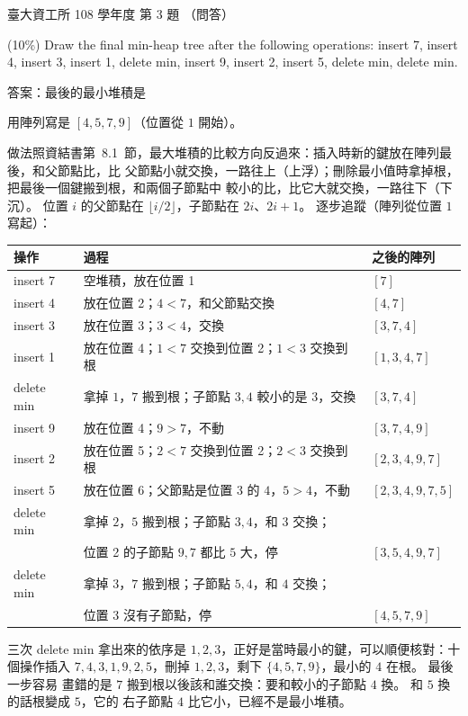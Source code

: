 \begin{pastexam}[label={px:ntu-108-dsaa-03}]{臺大資工所 108 學年度 第 3 題}
（問答）

(10\%) Draw the final min-heap tree after the following operations: insert 7, insert 4, insert 3,
insert 1, delete min, insert 9, insert 2, insert 5, delete min, delete min.
\end{pastexam}

\begin{pastsoln}
答案：最後的最小堆積是
\begin{center}
\end{center}
用陣列寫是 $[4, 5, 7, 9]$（位置從 $1$ 開始）。

做法照資結書第~8.1~節，最大堆積的比較方向反過來：插入時新的鍵放在陣列最後，和父節點比，比
父節點小就交換，一路往上（上浮）；刪除最小值時拿掉根，把最後一個鍵搬到根，和兩個子節點中
較小的比，比它大就交換，一路往下（下沉）。 位置 $i$ 的父節點在 $\lfloor i/2 \rfloor$，子節點在
$2i$、$2i + 1$。 逐步追蹤（陣列從位置 $1$ 寫起）：
\begin{center}
\small
\begin{tabular}{lll}
\toprule
操作 & 過程 & 之後的陣列 \\
\midrule
insert 7 & 空堆積，放在位置 1 & $[7]$ \\
insert 4 & 放在位置 2；$4 < 7$，和父節點交換 & $[4, 7]$ \\
insert 3 & 放在位置 3；$3 < 4$，交換 & $[3, 7, 4]$ \\
insert 1 & 放在位置 4；$1 < 7$ 交換到位置 2；$1 < 3$ 交換到根 & $[1, 3, 4, 7]$ \\
delete min & 拿掉 $1$，$7$ 搬到根；子節點 $3, 4$ 較小的是 $3$，交換 & $[3, 7, 4]$ \\
insert 9 & 放在位置 4；$9 > 7$，不動 & $[3, 7, 4, 9]$ \\
insert 2 & 放在位置 5；$2 < 7$ 交換到位置 2；$2 < 3$ 交換到根 & $[2, 3, 4, 9, 7]$ \\
insert 5 & 放在位置 6；父節點是位置 3 的 $4$，$5 > 4$，不動 & $[2, 3, 4, 9, 7, 5]$ \\
delete min & 拿掉 $2$，$5$ 搬到根；子節點 $3, 4$，和 $3$ 交換； & \\
 & \quad 位置 2 的子節點 $9, 7$ 都比 $5$ 大，停 & $[3, 5, 4, 9, 7]$ \\
delete min & 拿掉 $3$，$7$ 搬到根；子節點 $5, 4$，和 $4$ 交換； & \\
 & \quad 位置 3 沒有子節點，停 & $[4, 5, 7, 9]$ \\
\bottomrule
\end{tabular}
\end{center}

三次 delete min 拿出來的依序是 $1, 2, 3$，正好是當時最小的鍵，可以順便核對：十個操作插入
$7, 4, 3, 1, 9, 2, 5$，刪掉 $1, 2, 3$，剩下 $\{4, 5, 7, 9\}$，最小的 $4$ 在根。 最後一步容易
畫錯的是 $7$ 搬到根以後該和誰交換：要和較小的子節點 $4$ 換。 和 $5$ 換的話根變成 $5$，它的
右子節點 $4$ 比它小，已經不是最小堆積。
\end{pastsoln}
